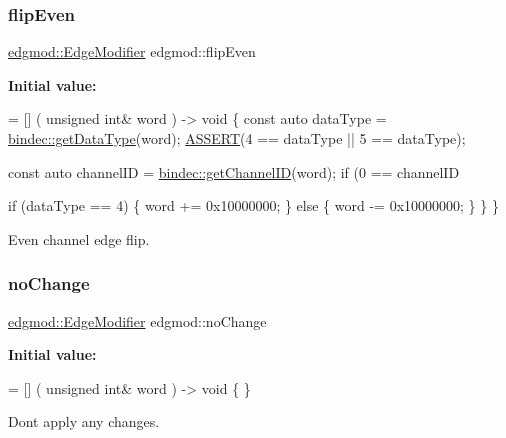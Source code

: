 \subsubsection{\texorpdfstring{flip\+Even}{flipEven}}
{\footnotesize\ttfamily \hyperlink{namespaceedgmod_abd975beb42f73310619eb134f62d7712}{edgmod\+::\+Edge\+Modifier} edgmod\+::flip\+Even}

{\bfseries Initial value\+:}
\begin{DoxyCode}
= [] (
    \textcolor{keywordtype}{unsigned} \textcolor{keywordtype}{int}& word
) -> \textcolor{keywordtype}{void} \{
    \textcolor{keyword}{const} \textcolor{keyword}{auto} dataType = \hyperlink{namespacebindec_a7a98adfd04c65f870f74a423bfd744fe}{bindec::getDataType}(word);
    \hyperlink{_debug_8hpp_aca68c0d4ac8df0838e209fb5300f7be3}{ASSERT}(4 == dataType || 5 == dataType);

    
    \textcolor{keyword}{const} \textcolor{keyword}{auto} channelID = \hyperlink{namespacebindec_af1997af0743251d010780a8f728fcd7e}{bindec::getChannelID}(word);
    \textcolor{keywordflow}{if} (0 == channelID%
        
        \textcolor{keywordflow}{if} (dataType == 4) \{
            word += 0x10000000;
        \} \textcolor{keywordflow}{else} \{
            word -= 0x10000000;
        \}
    \}
\}
\end{DoxyCode}


Even channel edge flip. 

\mbox{\label{namespaceedgmod_a912724097db2099cc7793a83e42673d7}} 
\subsubsection{\texorpdfstring{no\+Change}{noChange}}
{\footnotesize\ttfamily \hyperlink{namespaceedgmod_abd975beb42f73310619eb134f62d7712}{edgmod\+::\+Edge\+Modifier} edgmod\+::no\+Change}

{\bfseries Initial value\+:}
\begin{DoxyCode}
= [] (
    \textcolor{keywordtype}{unsigned} \textcolor{keywordtype}{int}& word
) -> \textcolor{keywordtype}{void} \{ \}
\end{DoxyCode}


Don\textquotesingle{}t apply any changes. 

